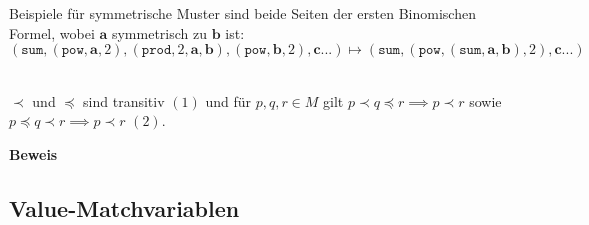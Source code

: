 
Beispiele für symmetrische Muster sind beide Seiten der ersten Binomischen Formel, wobei $\mathbf a$ symmetrisch zu $\mathbf b$ ist:
$$(\texttt{sum}, (\texttt{pow}, \mathbf a, 2), (\texttt{prod}, 2, \mathbf a, \mathbf b), (\texttt{pow}, \mathbf b, 2), \mathbf {c...}) \mapsto (\texttt{sum}, (\texttt{pow}, (\texttt{sum}, \mathbf a, \mathbf b), 2), \mathbf {c...})$$


\begin{lemma}\label{lemTransitivStark}~\\
$\prec$ und $\preceq$ sind transitiv $(1)$ und für $p, q, r \in M$  gilt $p \prec q \preceq r \implies p \prec r$ sowie $p \preceq q \prec r \implies p \prec r$ $(2)$. 
\end{lemma}

\textbf{Beweis}~\\

\subsection{Value-Matchvariablen}






















